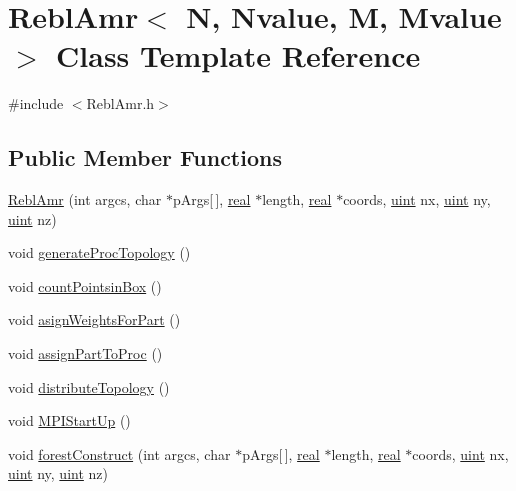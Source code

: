 \hypertarget{classReblAmr}{}\section{Rebl\+Amr$<$ N, Nvalue, M, Mvalue $>$ Class Template Reference}
\label{classReblAmr}


{\ttfamily \#include $<$Rebl\+Amr.\+h$>$}

\subsection*{Public Member Functions}
\begin{DoxyCompactItemize}
\item 
\mbox{\hyperlink{classReblAmr_a488d8ddc17e846da861a675599542106}{Rebl\+Amr}} (int argcs, char $\ast$p\+Args\mbox{[}$\,$\mbox{]}, \mbox{\hyperlink{definitions_8h_aedc0ad84d1e764530814f57ad931d02a}{real}} $\ast$length, \mbox{\hyperlink{definitions_8h_aedc0ad84d1e764530814f57ad931d02a}{real}} $\ast$coords, \mbox{\hyperlink{definitions_8h_a69aa29b598b851b0640aa225a9e5d61d}{uint}} nx, \mbox{\hyperlink{definitions_8h_a69aa29b598b851b0640aa225a9e5d61d}{uint}} ny, \mbox{\hyperlink{definitions_8h_a69aa29b598b851b0640aa225a9e5d61d}{uint}} nz)
\item 
void \mbox{\hyperlink{classReblAmr_a907b8f289b180b19c23a50ad63a2cfde}{generate\+Proc\+Topology}} ()
\item 
void \mbox{\hyperlink{classReblAmr_ace3c175fbab25b21c8a7174a7d90b16c}{count\+Pointsin\+Box}} ()
\item 
void \mbox{\hyperlink{classReblAmr_a1d870bec577ca1e6a0a649a820984fee}{asign\+Weights\+For\+Part}} ()
\item 
void \mbox{\hyperlink{classReblAmr_a5669456094f8fe106dd52af705ca9697}{assign\+Part\+To\+Proc}} ()
\item 
void \mbox{\hyperlink{classReblAmr_ac1be40e71c4df40ba3d4fb0086a710bf}{distribute\+Topology}} ()
\item 
void \mbox{\hyperlink{classReblAmr_a432a0fbbe5961e5bc972360c3bc28dce}{M\+P\+I\+Start\+Up}} ()
\item 
void \mbox{\hyperlink{classReblAmr_afd423ffee7cd189fc1f2c78236e66bac}{forest\+Construct}} (int argcs, char $\ast$p\+Args\mbox{[}$\,$\mbox{]}, \mbox{\hyperlink{definitions_8h_aedc0ad84d1e764530814f57ad931d02a}{real}} $\ast$length, \mbox{\hyperlink{definitions_8h_aedc0ad84d1e764530814f57ad931d02a}{real}} $\ast$coords, \mbox{\hyperlink{definitions_8h_a69aa29b598b851b0640aa225a9e5d61d}{uint}} nx, \mbox{\hyperlink{definitions_8h_a69aa29b598b851b0640aa225a9e5d61d}{uint}} ny, \mbox{\hyperlink{definitions_8h_a69aa29b598b851b0640aa225a9e5d61d}{uint}} nz)

\end{DoxyCompactItemize}
